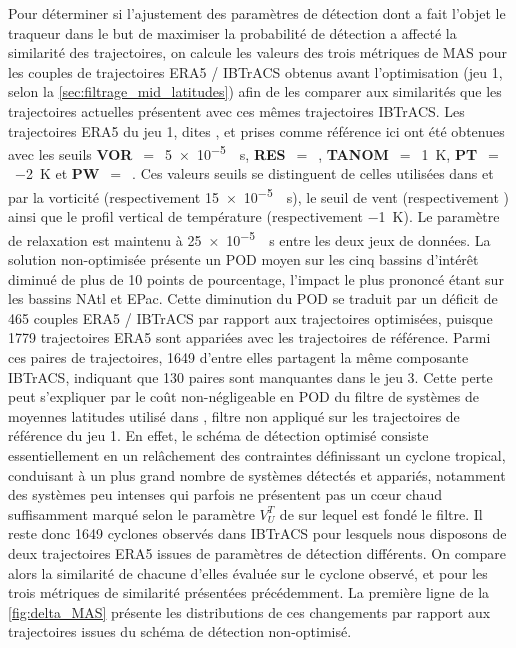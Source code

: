 \documentclass[../main.tex]{subfiles}
\begin{document}
Pour déterminer si l'ajustement des paramètres de détection dont a fait l'objet le traqueur dans le but de maximiser la probabilité de détection a affecté la
similarité des trajectoires, on calcule les valeurs des trois métriques de MAS pour les couples de trajectoires ERA5 / IBTrACS obtenus avant l'optimisation (jeu
1, selon la \cref{sec:filtrage_mid_latitudes}) afin de les comparer aux similarités que les trajectoires actuelles présentent avec ces mêmes trajectoires
IBTrACS. Les trajectoires ERA5 du jeu 1, dites , et prises comme référence ici ont été obtenues avec les seuils
\textbf{VOR}~$=$~\SI{5e-5}{\per\second}, \textbf{RES}~$=$~, \textbf{TANOM}~$=$~\SI{1}{\kelvin}, \textbf{PT}~$=$~\SI{-2}{\kelvin} et
\textbf{PW}~$=$~. Ces valeurs seuils se distinguent de celles utilisées dans \textcite{dulac_assessing_2023} et \textcite{bourdin_intercomparison_2022}
par la vorticité (respectivement \SI{15e-5}{\per\second}), le seuil de vent (respectivement ) ainsi que le profil vertical de température (respectivement
\SI{-1}{\kelvin}). Le paramètre de relaxation est maintenu à \SI{25e-5}{\per\second} entre les deux jeux de données. La solution non-optimisée présente un POD
moyen sur les cinq bassins d'intérêt diminué de plus de \num{10} points de pourcentage, l'impact le plus prononcé étant sur les bassins NAtl et EPac. Cette
diminution du POD se traduit par un déficit de \num{465} couples ERA5 / IBTrACS par rapport aux trajectoires optimisées, puisque \num{1779} trajectoires ERA5
sont appariées avec les trajectoires de référence. Parmi ces paires de trajectoires, \num{1649} d'entre elles partagent la même composante IBTrACS, indiquant
que \num{130} paires sont manquantes dans le jeu 3. Cette perte peut s'expliquer par le coût non-négligeable en POD du filtre de systèmes de moyennes latitudes
utilisé dans \textcite{dulac_assessing_2023}, filtre non appliqué sur les trajectoires de référence du jeu 1. En effet, le schéma de détection optimisé consiste
essentiellement en un relâchement des contraintes définissant un cyclone tropical, conduisant à un plus grand nombre de systèmes détectés et appariés, notamment
des systèmes peu intenses qui parfois ne présentent pas un cœur chaud suffisamment marqué selon le paramètre $V_U^T$ de \textcite{hart_cyclone_2003} sur lequel
est fondé le filtre. Il reste donc \num{1649} cyclones observés dans IBTrACS pour lesquels nous disposons de deux trajectoires ERA5 issues de paramètres de
détection différents. On compare alors la similarité de chacune d'elles évaluée sur le cyclone observé, et pour les trois métriques de similarité présentées
précédemment. La première ligne de la \cref{fig:delta_MAS} présente les distributions de ces changements par rapport aux trajectoires issues du schéma de
détection non-optimisé.
\end{document}
